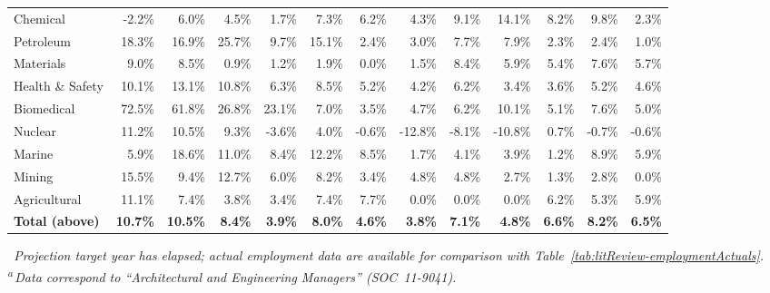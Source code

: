 \begin{table}[htbp]
\begin{tabular}{@{}lrrrrrrrrrrrr@{}}
    Chemical & -2.2\% & 6.0\% & 4.5\% & 1.7\% & 7.3\% & 6.2\% & 4.3\% & 9.1\% & 14.1\% & 8.2\% & 9.8\% & 2.3\% \\
    Petroleum & 18.3\% & 16.9\% & 25.7\% & 9.7\% & 15.1\% & 2.4\% & 3.0\% & 7.7\% & 7.9\% & 2.3\% & 2.4\% & 1.0\% \\
    Materials & 9.0\% & 8.5\% & 0.9\% & 1.2\% & 1.9\% & 0.0\% & 1.5\% & 8.4\% & 5.9\% & 5.4\% & 7.6\% & 5.7\% \\
    Health \& Safety & 10.1\% & 13.1\% & 10.8\% & 6.3\% & 8.5\% & 5.2\% & 4.2\% & 6.2\% & 3.4\% & 3.6\% & 5.2\% & 4.6\% \\
    Biomedical & 72.5\% & 61.8\% & 26.8\% & 23.1\% & 7.0\% & 3.5\% & 4.7\% & 6.2\% & 10.1\% & 5.1\% & 7.6\% & 5.0\% \\
    Nuclear & 11.2\% & 10.5\% & 9.3\% & -3.6\% & 4.0\% & -0.6\% & -12.8\% & -8.1\% & -10.8\% & 0.7\% & -0.7\% & -0.6\% \\
    Marine & 5.9\% & 18.6\% & 11.0\% & 8.4\% & 12.2\% & 8.5\% & 1.7\% & 4.1\% & 3.9\% & 1.2\% & 8.9\% & 5.9\% \\
    Mining & 15.5\% & 9.4\% & 12.7\% & 6.0\% & 8.2\% & 3.4\% & 4.8\% & 4.8\% & 2.7\% & 1.3\% & 2.8\% & 0.0\% \\
    Agricultural & 11.1\% & 7.4\% & 3.8\% & 3.4\% & 7.4\% & 7.7\% & 0.0\% & 0.0\% & 0.0\% & 6.2\% & 5.3\% & 5.9\% \\
    \midrule
    \bfseries Total (above) & \bfseries 10.7\% & \bfseries 10.5\% & \bfseries 8.4\% & \bfseries 3.9\% & \bfseries 8.0\% & \bfseries 4.6\% & \bfseries 3.8\% & \bfseries 7.1\% & \bfseries 4.8\% & \bfseries 6.6\% & \bfseries 8.2\% & \bfseries 6.5\% \\
    \bottomrule
  \end{tabular}
  \vspace{4pt}
  \parbox{0.98\linewidth}{
    \footnotesize\textit{\checkmark~Projection target year has elapsed; actual employment data are available for comparison with Table~\ref{tab:litReview-employmentActuals}.}
    \\[2pt]
    \textit{\textsuperscript{a}\,Data correspond to ``Architectural and Engineering Managers'' (SOC~11-9041).}
  }
\end{table}
